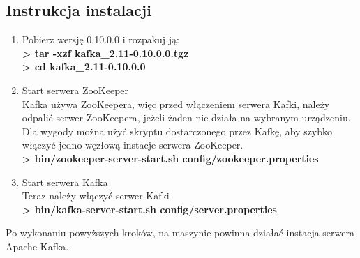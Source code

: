 \documentclass[a4paper,12pt]{article}
\begin{document}
\subsection{Instrukcja instalacji}
\begin{enumerate}
\item Pobierz wersję 0.10.0.0 i rozpakuj ją:\\
\textbf{> tar -xzf kafka\_2.11-0.10.0.0.tgz}\\
\textbf{> cd kafka\_2.11-0.10.0.0}\\
\item Start serwera ZooKeeper\\
Kafka używa ZooKeepera, więc przed włączeniem serwera Kafki, należy odpalić serwer ZooKeepera, jeżeli żaden nie działa na wybranym urządzeniu. Dla wygody można użyć skryptu dostarczonego przez Kafkę, aby szybko włączyć jedno-węzłową instacje serwera ZooKeeper.\\
\textbf{> bin/zookeeper-server-start.sh config/zookeeper.properties}\\
\item Start serwera Kafka\\
Teraz należy włączyć serwer Kafki\\
\textbf{> bin/kafka-server-start.sh config/server.properties}
\end{enumerate}	
Po wykonaniu powyższych kroków, na maszynie powinna działać instacja serwera Apache Kafka.
\end{document}
